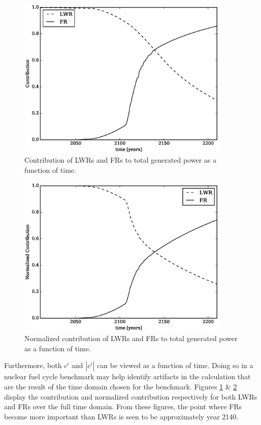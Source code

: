\begin{figure}[htb]
\centering
\includegraphics[width=0.9\textwidth]{c-of-t.eps}
\caption{Contribution of LWRs and FRs to total generated power as a 
function of time.}
\label{c-of-t}
\end{figure}

\begin{figure}[htb]
\centering
\includegraphics[width=0.9\textwidth]{normc-of-t.eps}
\caption{Normalized contribution of LWRs and FRs to total generated power 
as a function of time.}
\label{normc-of-t}
\end{figure}

Furthermore, both $c^i$ and $|c^i|$ can be viewed as a function of time.
Doing so in a nuclear fuel cycle benchmark may help identify artifacts in the
calculation that are the result of the time domain chosen for the benchmark.
Figures \ref{c-of-t} \& \ref{normc-of-t} display the contribution and 
normalized contribution respectively for both LWRs and FRs over the full 
time domain. From these figures, the point where FRs become more important 
than LWRs is seen to be approximately year 2140.
